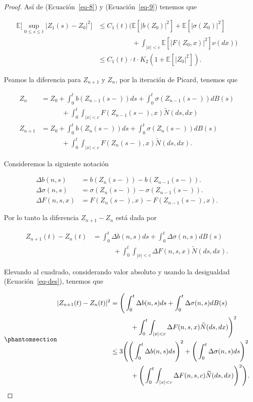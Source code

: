 \documentclass[
  spanish,
  us-letterpaper,
]{scrreprt}
\theoremstyle{plain}
\theoremstyle{plain}
\theoremstyle{definition}
\theoremstyle{plain}
\theoremstyle{remark}
\begin{document}
\begin{proof}
Así de (Ecuación~\ref{eq-8}) y (Ecuación~\ref{eq-9}) tenemos que

\[
    \begin{aligned}
        \mathbb{E}\Bigg[\sup\limits_{0\leq s\leq t}|Z_1(s)-Z_0|^2\Bigg]
        & \leq C_1(t)\Bigg(\mathbb{E}[|b(Z_0)|^2]+\mathbb{E}[|\sigma(Z_0)|^2]\\ 
        & \qquad \qquad\quad+\int_{|x|<c}\mathbb{E}[|F(Z_0,x)|^2]\nu(dx)\Bigg)\\
        & \leq C_1(t)\cdot t\cdot K_2(1+\mathbb{E}[|Z_0|^2]).
    \end{aligned}
\]

Peamos la diferencia para \(Z_{n+1}\) y \(Z_n\), por la iteración de
Picard, tenemos que

\[
    \begin{aligned}
        Z_n & = Z_0 + \int_0^t b(Z_{n-1}(s-))ds+\int_0^t \sigma(Z_{n-1}(s-))dB(s)\\ 
        &\qquad\quad + \int_0^t \int_{|x|<c} F(Z_{n-1}(s-),x)\widetilde{N}(ds,dx)\\ 
        Z_{n+1} & = Z_0 + \int_0^t b(Z_{n}(s-))ds+\int_0^t \sigma(Z_{n}(s-))dB(s)\\ 
        &\qquad\quad + \int_0^t \int_{|x|<c} F(Z_{n}(s-),x)\widetilde{N}(ds,dx).
    \end{aligned}
\]

Consideremos la siguiente notación

\[
    \begin{aligned}
        \Delta b(n,s) & = b(Z_n(s-))-b(Z_{n-1}(s-)).\\ 
        \Delta \sigma(n,s) & = \sigma(Z_n(s-))-\sigma(Z_{n-1}(s-)).\\ 
        \Delta F(n,s,x) & = F(Z_n(s-),x)-F(Z_{n-1}(s-),x).
    \end{aligned}
\]

Por lo tanto la diferencia \(Z_{n+1}-Z_n\) está dada por

\[
    \begin{aligned}
        Z_{n+1}(t)-Z_n(t) & = \int_0^t \Delta b(n,s)ds + \int_0^t \Delta \sigma(n,s)dB(s)\\ 
        & \qquad \quad +\int_0^t\int_{|x|<c}\Delta F(n,s,x)\widetilde{N}(ds,dx).
    \end{aligned}
\]

Elevando al cuadrado, considerando valor absoluto y usando la
desigualdad (Ecuación~\ref{eq-des}), tenemos que

\begin{equation}\phantomsection\label{eq-10}{
    \begin{aligned}
        |Z_{n+1}(t)-Z_n(t)|^2 & = \Bigg( \int_0^t \Delta b(n,s)ds + \int_0^t \Delta \sigma(n,s)dB(s)\\ 
        &\qquad\quad +\int_0^t\int_{|x|<c}\Delta F(n,s,x)\widetilde{N}(ds,dx)\Bigg)^2\\ 
        & \leq 3\Bigg(\Bigg(\int_0^t \Delta b(n,s)ds\Bigg)^2+\Bigg(\int_0^t  \Delta \sigma(n,s)ds\Bigg)^2\\ 
        &\qquad\quad +\Bigg(\int_0^t\int_{|x|<c}\Delta F(n,s,c)\widetilde{N}(ds,dx)\Bigg)^2\Bigg).
    \end{aligned}
}\end{equation}


\end{proof}
\end{document}
